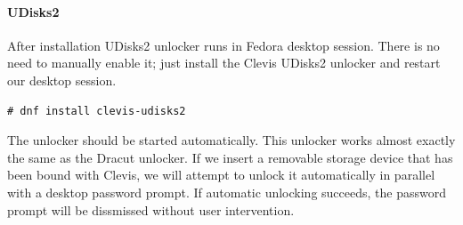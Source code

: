 \paragraph{UDisks2}\label{udisk2}
After installation UDisks2 unlocker runs in Fedora desktop session.
There is no need to manually enable it; just install the Clevis UDisks2 unlocker and restart our desktop session.
\begin{lstlisting}[columns=fixed,basicstyle=\ttfamily\footnotesize,tabsize=4,backgroundcolor=\color{yellow!10}]
# dnf install clevis-udisks2
\end{lstlisting}
The unlocker should be started automatically.
This unlocker works almost exactly the same as the Dracut unlocker.
If we insert a removable storage device that has been bound with Clevis, we will attempt to unlock it automatically in parallel with a desktop password prompt.
If automatic unlocking succeeds, the password prompt will be dissmissed without user intervention.
